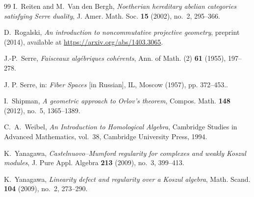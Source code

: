\documentclass[11pt]{article}
\theoremstyle{definition}
\theoremstyle{remark}
\begin{document}
\begin{thebibliography}{99}
I.~Reiten and M.~Van den Bergh,
\emph{Noetherian hereditary abelian categories satisfying Serre duality},
J. Amer. Math. Soc. \textbf{15} (2002), no.~2, 295--366.

D.~Rogalski,
\emph{An introduction to noncommutative projective geometry},
preprint (2014), available at \url{https://arxiv.org/abs/1403.3065}.

J.-P.~Serre,
\emph{Faisceaux algébriques cohérents},
Ann. of Math. (2) \textbf{61} (1955), 197--278.

J. P. Serre, in: \emph{Fiber Spaces} [in Russian], IL, Moscow (1957), pp. 372–453..

I.~Shipman,
\emph{A geometric approach to Orlov's theorem},
Compos. Math. \textbf{148} (2012), no.~5, 1365--1389.

C.~A.~Weibel,
\emph{An Introduction to Homological Algebra},
Cambridge Studies in Advanced Mathematics, vol.~38,
Cambridge University Press, 1994.

K.~Yanagawa,
\emph{Castelnuovo--Mumford regularity for complexes and weakly Koszul modules},
J. Pure Appl. Algebra \textbf{213} (2009), no.~3, 399--413.

K.~Yanagawa,
\emph{Linearity defect and regularity over a Koszul algebra},
Math. Scand. \textbf{104} (2009), no.~2, 273--290.

\end{thebibliography}
\end{document}
